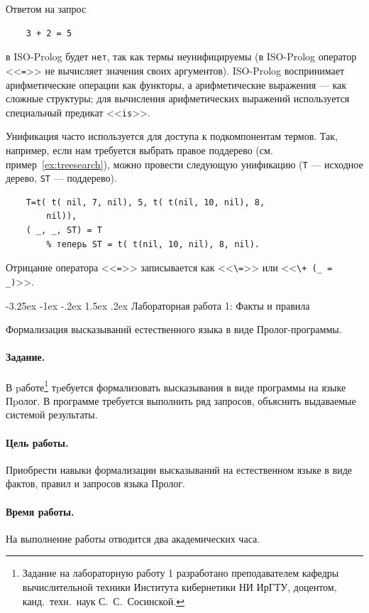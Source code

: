 \documentclass[12pt, openany, twoside]{book} %
\makeatletter
\renewcommand\section{\@startsection {section}{1}{\z@}%
                                   {-3.25ex \@plus -1ex \@minus -.2ex}%
                                   {1.5ex \@plus.2ex}%
                                   {\normalfont\large\bfseries}}
\makeatother
\begin{document}
Ответом на запрос
{\tt\begin{verbatim}
    3 + 2 = 5
\end{verbatim}}
\noindent в ISO-Prolog будет {\tt нет}, так как термы неунифицируемы (в ISO-Prolog оператор <<{\tt =}>> не вычисляет значения своих аргументов). ISO-Prolog воспринимает арифметические операции как функторы, а арифметические выражения --- как сложные структуры; для вычисления арифметических выражений используется специальный предикат <<{\tt is}>>. %

Унификация часто используется для доступа к подкомпонентам термов. Так, например, если нам требуется выбрать правое поддерево (см. пример~\ref{ex:treesearch}), можно провести следующую унификацию ({\tt T} --- исходное дерево, {\tt ST} --- поддерево).
{\tt\begin{verbatim}
    T=t( t( nil, 7, nil), 5, t( t(nil, 10, nil), 8,
        nil)),
    ( _, _, ST) = T
        % теперь ST = t( t(nil, 10, nil), 8, nil).
\end{verbatim}}

Отрицание оператора <<{\tt =}>> записывается как <<{\tt \verb|\=|}>> или <<{\tt \verb|\+| (\_ = \_)}>>.

\section{Лабораторная работа 1: Факты и правила}

Формализация высказываний естественного языка в виде Про\-лог-прог\-рам\-мы.

\paragraph{Задание.} В pаботе\footnote{Задание на лабораторную работу 1 разработано преподавателем кафедры вычислительной техники Института кибернетики НИ ИрГТУ, доцентом, канд.~техн.~наук С.~С.~Сосинской.} тpебуется формализовать высказывания в виде программы на языке Пpолог. В программе требуется выполнить ряд запросов, объяснить выдаваемые системой результаты.

\paragraph{Цель работы.} Приобрести навыки формализации высказываний на естественном языке в виде фактов, правил и запросов языка Пролог.

\paragraph{Время работы.} На выполнение работы отводится два академических часа.
\end{document}
